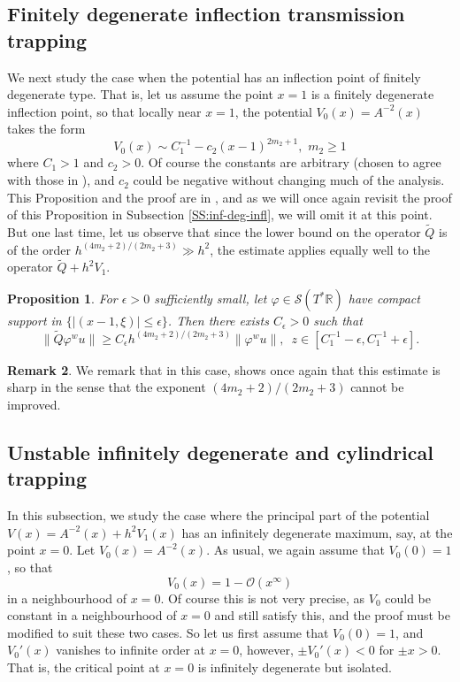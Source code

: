 \documentclass[twoside, final]{amsart}
\newtheorem{proposition}{Proposition}[section]
\theoremstyle{definition}
\newtheorem{remark}[proposition]{Remark}
\numberwithin{equation}{section}
\begin{document}
\subsection{Finitely degenerate inflection transmission trapping}

We next study the case when the potential has an inflection point of
finitely degenerate type.  That is, let us assume the point $x = 1$ is
a finitely degenerate inflection point, so that locally near $x = 1$,
the potential $V_0(x) = A^{-2}(x)$ takes the form
\[
V_0(x) \sim C_1^{-1} -c_2(x-1)^{2m_2 + 1}, \,\, m_2 {\geqslant} 1
\]
where $C_1>1$ and $c_2>0$.  Of course the constants are arbitrary
(chosen to agree with those in \cite{ChMe-lsm}), and $c_2$ could be
negative without changing much of the analysis.  This Proposition and the
proof are in \cite{ChMe-lsm}, and as we will once again
revisit the proof of this Proposition in Subsection \ref{SS:inf-deg-infl},
we will omit it at this point.  But one last time, let us observe that
since the lower bound on the operator ${\widetilde{Q}}$ is of the order $h^{(4m_2 +
2)/(2m_2+3)} \gg h^2$, the estimate applies equally well to the
operator ${\widetilde{Q}} + h^2 V_1$.

\begin{proposition}
\label{P:ml-inv-2}
For $\epsilon>0$ sufficiently small, let ${\varphi} \in {{\mathcal S}}(T^* {{\mathbb R}})$
have compact support in $\{ |(x-1,\xi) |{\leqslant} \epsilon\}$.  Then there
exists $C_\epsilon>0$ such that 
\begin{equation}
\label{E:ml-inv-2}
\| {\widetilde{Q}} {\varphi}^w u \| {\geqslant} C_\epsilon
h^{(4m_2+2)/(2m_2+3)}  \|
{\varphi}^w u \|, \,\,\, z \in [C_1^{-1}-\epsilon, C_1^{-1} + \epsilon].
\end{equation}
\end{proposition}

\begin{remark}
We remark that in this case, \cite{ChMe-lsm} shows once again that
this estimate is sharp in the sense that the exponent
$(4m_2+2)/(2m_2+3)$ cannot be improved.

\end{remark}

\subsection{Unstable infinitely degenerate and cylindrical trapping}
\label{SS:unst-inf}

In this subsection, we study the case where the principal part of the
potential $V(x) = A^{-2}(x) + h^2 V_1(x)$ has
an infinitely degenerate maximum, say, at the point $x = 0$.  Let
$V_0(x) = A^{-2}(x)$.  As
usual, we again assume that $V_0(0) = 1$, so that
\[
V_0(x) = 1 - {{\mathcal O}}(x^\infty)
\]
in a neighbourhood of $x = 0$.  Of course this is not very precise, as
$V_0$ could be constant in a neighbourhood of $x = 0$ and still satisfy
this, and the proof must be modified to suit these two cases.  So let us first assume that $V_0(0) = 1$, and
$V_0'(x)$ vanishes to infinite order at $x = 0$, however, $\pm V_0'(x) <0$
for $\pm x >0$.  That is, the critical point at $x = 0$ is infinitely
degenerate but isolated.
\end{document}

